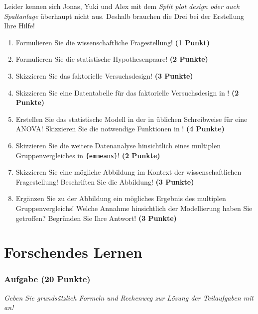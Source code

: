 \documentclass[a4paper, 9pt]{scrartcl}\usepackage[]{graphicx}\usepackage[]{xcolor}
\begin{document}
Leider kennen sich Jonas, Yuki und Alex mit dem \textit{Split plot design oder auch Spaltanlage} überhaupt nicht aus. Deshalb brauchen die Drei bei der Erstellung Ihre Hilfe!

\begin{enumerate}
  \setcounter{enumi}{0}
  \item Formulieren Sie die wissenschaftliche Fragestellung! \textbf{(1 Punkt)}
  \item Formulieren Sie die statistische Hypothesenpaare! \textbf{(2 Punkte)}
  \item Skizzieren Sie das faktorielle Versuchsdesign! \textbf{(3 Punkte)}
  \item Skizzieren Sie eine Datentabelle für das faktorielle Versuchsdesign in \Rlogo! \textbf{(2 Punkte)}
  \item Erstellen Sie das statistische Modell in der in \Rlogo üblichen Schreibweise für eine ANOVA! Skizzieren Sie die notwendige Funktionen in \Rlogo! \textbf{(4 Punkte)}
  \item Skizzieren Sie die weitere Datenanalyse hinsichtlich eines multiplen Gruppenvergleiches in \texttt{\{emmeans\}}! \textbf{(2 Punkte)}
  \item Skizzieren Sie eine mögliche Abbildung im Kontext der wissenschaftlichen Fragestellung! Beschriften Sie die Abbildung! \textbf{(3 Punkte)}
  \item Ergänzen Sie zu der Abbildung ein mögliches Ergebnis des multiplen Gruppenvergleichs! Welche Annahme hinsichtlich der Modellierung haben Sie getroffen? Begründen Sie Ihre Antwort! \textbf{(3 Punkte)}
\end{enumerate} 
\clearpage
\part{Forschendes Lernen}

\section{Aufgabe \hfill (20 Punkte)}

\textit{Geben Sie grundsätzlich Formeln und Rechenweg zur Lösung der Teilaufgaben mit an!} \\[1Ex]
 
\end{document}
